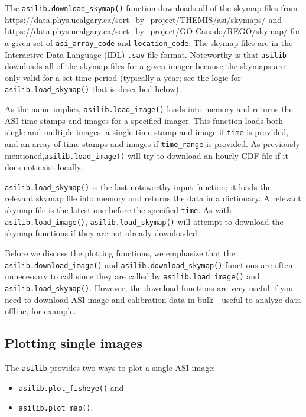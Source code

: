 \documentclass[draft]{agujournal2019}
\begin{document}
The \verb|asilib.download_skymap()| function downloads all of the skymap files from \url{https://data.phys.ucalgary.ca/sort_by_project/THEMIS/asi/skymaps/} and \url{https://data.phys.ucalgary.ca/sort_by_project/GO-Canada/REGO/skymap/} for a given set of \verb|asi_array_code| and \verb|location_code|. The skymap files are in the Interactive Data Language (IDL) \verb|.sav| file format. Noteworthy is that \verb|asilib| downloads all of the skymap files for a given imager because the skymaps are only valid for a set time period (typically a year; see the logic for \verb|asilib.load_skymap()| that is described below).

As the name implies, \verb|asilib.load_image()| loads into memory and returns the ASI time stamps and images for a specified imager. This function loads both single and multiple images: a single time stamp and image if \verb|time| is provided, and an array of time stamps and images if \verb|time_range| is provided. As previously mentioned,\verb|asilib.load_image()| will try to download an hourly CDF file if it does not exist locally.

\verb|asilib.load_skymap()| is the last noteworthy input function; it loads the relevant skymap file into memory and returns the data in a dictionary. A relevant skymap file is the latest one before the specified \verb|time|. As with \verb|asilib.load_image()|, \verb|asilib.load_skymap()| will attempt to download the skymap functions if they are not already downloaded.

Before we discuss the plotting functions, we emphasize that the \verb|asilib.download_image()| and \verb|asilib.download_skymap()| functions are often unnecessary to call since they are called by \verb|asilib.load_image()| and \verb|asilib.load_skymap()|. However, the download functions are very useful if you need to download ASI image and calibration data in bulk---useful to analyze data offline, for example.

\subsection{Plotting single images}

The \verb|asilib| provides two ways to plot a single ASI image:

\begin{itemize}
      \item \verb|asilib.plot_fisheye()| and
      \item \verb|asilib.plot_map()|.
\end{itemize}
\end{document}

